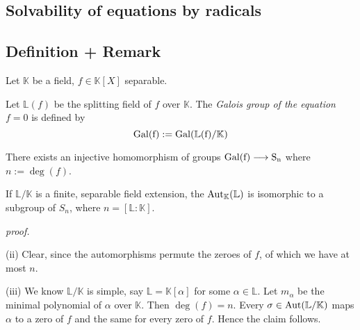 \documentclass[12pt]{book}
\begin{document}
\begin{spacing}{1.3}
\section{Solvability of equations by radicals}
\renewcommand*\thesection{\arabic{section}}

\subsection{Definition + Remark} %
Let $\mathbb{K}$ be a field, $f \in \mathbb{K}[X]$ separable.
\begin{compactenum}
\item Let $\mathbb{L}(f)$ be the splitting field of $f$ over $\mathbb{K}$. The \textit{Galois group of the equation }$f=0$ is defined by
$$ \rm{Gal}(f):=\rm{Gal}(\mathbb{L}(f)/\mathbb{K})$$
\item There exists an injective homomorphism of groups $\rm{Gal}(f)\longrightarrow S_n$ where $n:= \deg(f)$.
\item If $\mathbb{L}/\mathbb{K}$ is a finite, separable field extension, the $\rm{Aut}_{\mathbb{K}}(\mathbb{L})$ is isomorphic to a subgroup of $S_n$, where $n= [\mathbb{L}:\mathbb{K}]$.
\end{compactenum}
\textit{proof.}
\begin{compactenum}
\item[(ii)] Clear, since the automorphisms permute the zeroes of $f$, of which we have at most $n$.
\item[(iii)] We know $\mathbb{L}/\mathbb{K}$ is simple, say $\mathbb{L}=\mathbb{K}[\alpha]$ for some $\alpha \in \mathbb{L}$. Let $m_{\alpha}$ be the minimal polynomial of $\alpha$ over $\mathbb{K}$. Then $\deg(f)=n$. Every $\sigma \in \rm{Aut}(\mathbb{L}/\mathbb{K})$ maps $\alpha$ to a zero of $f$ and the same for every zero of $f$. Hence the claim follows.
\end{compactenum}


\end{spacing}
\end{document}
